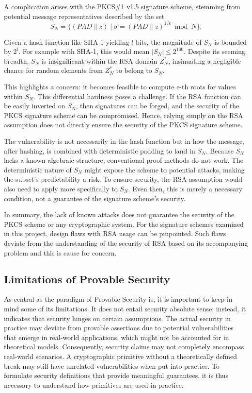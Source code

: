 \documentclass[]{final_report}
\theoremstyle{definition}
\begin{document}
A complication arises with the PKCS\#1 v1.5 signature scheme, stemming from potential message representatives described by the set
\[ S_N = \{ (PAD \| z) \mid \sigma = (PAD \| z)^{1/e} \bmod N \}. \]

Given a hash function like SHA-1 yielding $l$ bits, the magnitude of $S_N$ is bounded by $2^l$. For example with SHA-1, this would mean  $|S_N| \leq 2^{160}$. Despite its seeming breadth, $S_N$ is insignificant within the RSA domain \( Z_N^* \), insinuating a negligible chance for random elements from \( Z_N^* \) to belong to \( S_N \).

This highlights a concern: it becomes feasible to compute e-th roots for values within $S_N$. This differential hardness poses a challenge. If the RSA function can be easily inverted on  $S_N$, then signatures can be forged, and the security of the PKCS signature scheme can be compromised. Hence, relying simply on the RSA assumption does not directly ensure the security of the PKCS signature scheme. 

The vulnerability is not necessarily in the hash function but in how the message, after hashing, is combined with deterministic padding to land in \( S_N \). Because \( S_N \) lacks a known algebraic structure, conventional proof methods do not work. The deterministic nature of \( S_N \) might expose the scheme to potential attacks, making the subset's predictability a risk. To ensure security, the RSA assumption would also need to apply more specifically to  $S_N$. Even then, this is merely a necessary condition, not a guarantee of the signature scheme's security. 

In summary, the lack of known attacks does not guarantee the security of the PKCS scheme or any cryptographic system. For the signature schemes examined in this project, design flaws with RSA usage can be pinpointed. Such flaws deviate from the understanding of the security of RSA based on its accompanying problem and this is cause for concern.


\subsection{Limitations of Provable Security}
As central as the paradigm of Provable Security is, it is important to keep in mind some of its limitations. It does not entail security absolute sense; instead, it indicates that security hinges on certain assumptions. The actual security in practice may deviate from provable assertions due to potential vulnerabilities that emerge in real-world applications, which might not be accounted for in theoretical models. Consequently, security claims may not completely encompass real-world scenarios. A cryptographic primitive without a theoretically defined break may still have unrelated vulnerabilities when put into practice. To formulate security definitions that provide meaningful guarantees, it is thus necessary to understand how primitives are used in practice.
\end{document}
